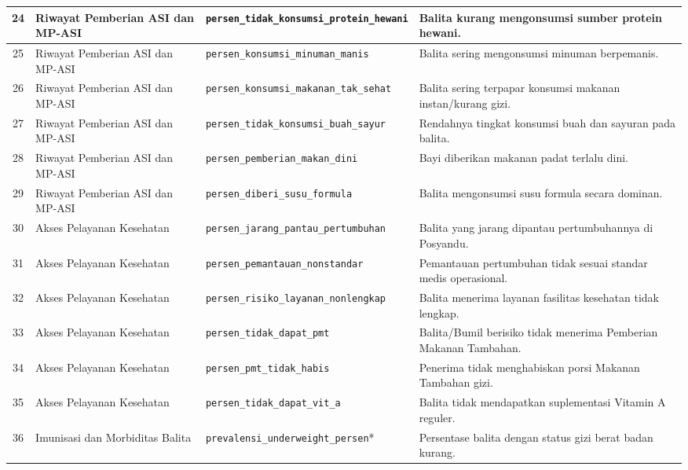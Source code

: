 \begin{longtable}{|c|p{}|p{}|p{}|}
    24 & Riwayat Pemberian ASI dan MP-ASI & \texttt{persen\_\allowbreak tidak\_\allowbreak konsumsi\_\allowbreak protein\_\allowbreak hewani} & Balita kurang mengonsumsi sumber protein hewani. \tabularnewline \hline
    25 & Riwayat Pemberian ASI dan MP-ASI & \texttt{persen\_\allowbreak konsumsi\_\allowbreak minuman\_\allowbreak manis} & Balita sering mengonsumsi minuman berpemanis. \tabularnewline \hline
    26 & Riwayat Pemberian ASI dan MP-ASI & \texttt{persen\_\allowbreak konsumsi\_\allowbreak makanan\_\allowbreak tak\_\allowbreak sehat} & Balita sering terpapar konsumsi makanan instan/kurang gizi. \tabularnewline \hline
    27 & Riwayat Pemberian ASI dan MP-ASI & \texttt{persen\_\allowbreak tidak\_\allowbreak konsumsi\_\allowbreak buah\_\allowbreak sayur} & Rendahnya tingkat konsumsi buah dan sayuran pada balita. \tabularnewline \hline
    28 & Riwayat Pemberian ASI dan MP-ASI & \texttt{persen\_\allowbreak pemberian\_\allowbreak makan\_\allowbreak dini} & Bayi diberikan makanan padat terlalu dini. \tabularnewline \hline
    29 & Riwayat Pemberian ASI dan MP-ASI & \texttt{persen\_\allowbreak diberi\_\allowbreak susu\_\allowbreak formula} & Balita mengonsumsi susu formula secara dominan. \tabularnewline \hline
    30 & Akses Pelayanan Kesehatan & \texttt{persen\_\allowbreak jarang\_\allowbreak pantau\_\allowbreak pertumbuhan} & Balita yang jarang dipantau pertumbuhannya di Posyandu. \tabularnewline \hline
    31 & Akses Pelayanan Kesehatan & \texttt{persen\_\allowbreak pemantauan\_\allowbreak nonstandar} & Pemantauan pertumbuhan tidak sesuai standar medis operasional. \tabularnewline \hline
    32 & Akses Pelayanan Kesehatan & \texttt{persen\_\allowbreak risiko\_\allowbreak layanan\_\allowbreak nonlengkap} & Balita menerima layanan fasilitas kesehatan tidak lengkap. \tabularnewline \hline
    33 & Akses Pelayanan Kesehatan & \texttt{persen\_\allowbreak tidak\_\allowbreak dapat\_\allowbreak pmt} & Balita/Bumil berisiko tidak menerima Pemberian Makanan Tambahan. \tabularnewline \hline
    34 & Akses Pelayanan Kesehatan & \texttt{persen\_\allowbreak pmt\_\allowbreak tidak\_\allowbreak habis} & Penerima tidak menghabiskan porsi Makanan Tambahan gizi. \tabularnewline \hline
    35 & Akses Pelayanan Kesehatan & \texttt{persen\_\allowbreak tidak\_\allowbreak dapat\_\allowbreak vit\_\allowbreak a} & Balita tidak mendapatkan suplementasi Vitamin A reguler. \tabularnewline \hline
    36 & Imunisasi dan Morbiditas Balita & \texttt{prevalensi\_\allowbreak underweight\_\allowbreak persen}* & Persentase balita dengan status gizi berat badan kurang. \tabularnewline \hline

\end{longtable}

